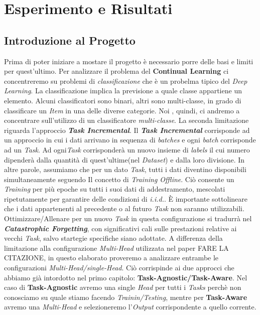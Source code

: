 \chapter{Esperimento e Risultati}\label{ch:chapter3}
\section{Introduzione al Progetto}
Prima di poter iniziare a mostare il progetto è necessario porre delle basi e limiti per quest'ultimo.
Per analizzare il problema del \textbf{Continual Learning} ci concentreremo su problemi di \textit{classificazione} che è un probelma tipico del \textit{Deep Learning}. La classificazione implica la previsione a quale classe appartiene un elemento. Alcuni classificatori sono binari, altri sono multi-classe, in grado di classificare un \textit{Item} in una delle diverse categorie. Noi  , quindi, ci andremo a concentrare sull'utilizzo di un classificatore \textit{multi-classe}.
\newline
La seconda limitazione riguarda l'approccio \textbf{\textit{Task Incremental}}. Il \textbf{\textit{Task Incremental}} corrisponde ad un approccio in cui i dati arrivano in sequenza di \textit{batches} e ogni
\textit{batch} corrisponde ad un \textit{Task}. Ad ogni\textit{Task} corrisponderà un nuovo insieme di \textit{labels} il cui numero dipenderà dalla quantità di quest'ultime(nel \textit{Dataset}) e dalla loro divisione. In altre parole, assumiamo  che per un dato \textit{Task}, tutti i dati diventino disponibili simultaneamente seguendo Il concetto di \textit{Training Offline}. Ciò consente un \textit{Training} per più epoche su tutti i suoi dati di addestramento, mescolati ripetutamente per garantire delle condizioni di 
\textit{i.i.d.}. È importante sottolineare che i dati appartenenti al  precedente o al futuro \textit{Task}
non saranno utilizzabili. Ottimizzare/Allenare per un nuovo \textit{Task} in questa configurazione si tradurrà nel \textit{\textbf{Catastrophic Forgetting}}, con significativi
cali sulle prestazioni relative ai vecchi \textit{Task}, salvo startegie specifiche siano adottate.
\newline 
A differenza della limitazione alla configurazione \textit{Multi-Head} utilizzata nel paper FARE LA CITAZIONE,
in questo elaborato proveremo a analizzare entrambe le configurazioni \textit{Multi-Head/single-Head}. Ciò corrispinde ai due approcci che abbiamo già intordotto nel primo capitolo: \textbf{Task-Agnostic/Task-Aware}. Nel caso di \textbf{Task-Agnostic} avremo una single \textit{Head} per tutti i \textit{Tasks} perchè non conosciamo su quale stiamo facendo \textit{Trainin/Testing}, mentre per \textbf{Task-Aware} avremo una \textit{Multi-Head} e selezioneremo l'\textit{Output} corrispondente a quello corrente.
